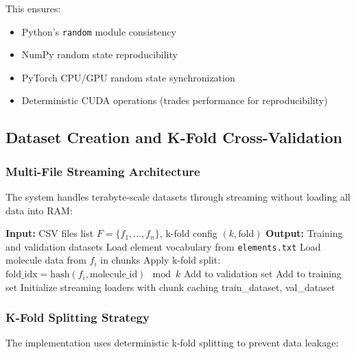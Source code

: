 \documentclass[11pt,a4paper]{article}
\begin{document}
This ensures:
\begin{itemize}
    \item Python's \texttt{random} module consistency
    \item NumPy random state reproducibility
    \item PyTorch CPU/GPU random state synchronization
    \item Deterministic CUDA operations (trades performance for reproducibility)
\end{itemize}

\subsection{Dataset Creation and K-Fold Cross-Validation}

\subsubsection{Multi-File Streaming Architecture}

The system handles terabyte-scale datasets through streaming without loading all data into RAM:

\begin{algorithm}
\caption{Multi-File Streaming Dataset}
\begin{algorithmic}[1]
\State \textbf{Input:} CSV files list $F = \{f_1, \ldots, f_n\}$, k-fold config $(k, \text{fold})$
\State \textbf{Output:} Training and validation datasets
\State
\State Load element vocabulary from \texttt{elements.txt}
    \State Load molecule data from $f_i$ in chunks
    \State Apply k-fold split: $\text{fold\_idx} = \text{hash}(f_i, \text{molecule\_id}) \mod k$
        \State Add to validation set
    \Else
        \State Add to training set
    \EndIf
\EndFor
\State Initialize streaming loaders with chunk caching
\State \Return train\_dataset, val\_dataset
\end{algorithmic}
\end{algorithm}

\subsubsection{K-Fold Splitting Strategy}

The implementation uses deterministic k-fold splitting to prevent data leakage:
\end{document}

